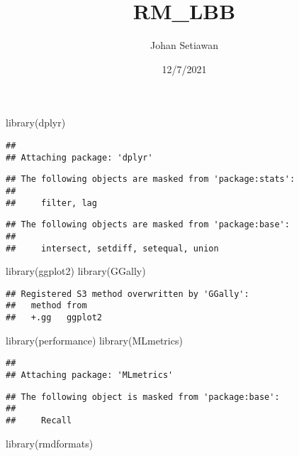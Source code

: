 \documentclass[
  ignorenonframetext,
]{beamer}
\title{RM\_LBB}
\author{Johan Setiawan}
\date{12/7/2021}
\newenvironment{Shaded}{\begin{snugshade}}{\end{snugshade}}
\newcommand{\FunctionTok}[1]{\textcolor[rgb]{0.00,0.00,0.00}{#1}}
\newcommand{\NormalTok}[1]{#1}
\begin{document}
\frame{\titlepage}

\begin{frame}[fragile]
\begin{Shaded}
\begin{Highlighting}[]
\FunctionTok{library}\NormalTok{(dplyr)}
\end{Highlighting}
\end{Shaded}

\begin{verbatim}
## 
## Attaching package: 'dplyr'
\end{verbatim}

\begin{verbatim}
## The following objects are masked from 'package:stats':
## 
##     filter, lag
\end{verbatim}

\begin{verbatim}
## The following objects are masked from 'package:base':
## 
##     intersect, setdiff, setequal, union
\end{verbatim}

\begin{Shaded}
\begin{Highlighting}[]
\FunctionTok{library}\NormalTok{(ggplot2)}
\FunctionTok{library}\NormalTok{(GGally)}
\end{Highlighting}
\end{Shaded}

\begin{verbatim}
## Registered S3 method overwritten by 'GGally':
##   method from   
##   +.gg   ggplot2
\end{verbatim}

\begin{Shaded}
\begin{Highlighting}[]
\FunctionTok{library}\NormalTok{(performance)}
\FunctionTok{library}\NormalTok{(MLmetrics)}
\end{Highlighting}
\end{Shaded}

\begin{verbatim}
## 
## Attaching package: 'MLmetrics'
\end{verbatim}

\begin{verbatim}
## The following object is masked from 'package:base':
## 
##     Recall
\end{verbatim}

\begin{Shaded}
\begin{Highlighting}[]
\FunctionTok{library}\NormalTok{(rmdformats)}
\end{Highlighting}
\end{Shaded}


\end{frame}
\end{document}
